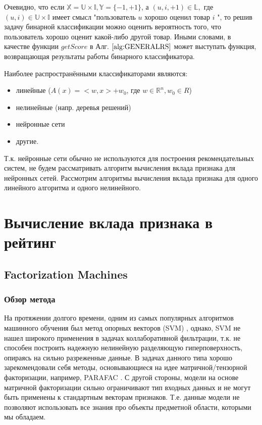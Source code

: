\documentclass[12pt,a4paper]{report}
\begin{document}
Очевидно, что если $\mathbb{X} = \mathbb{U} \times \mathbb{I}, \mathbb{Y} = \{-1, +1\}$, а
 $(u, i, +1) \in \mathbb{L},$ где $(u, i) \in \mathbb{U} \times \mathbb{I}$ имеет смысл "пользователь $u$ хорошо оценил товар $i$ ", то решив задачу бинарной классификации можно оценить вероятность того, что пользователь хорошо оценит какой-либо другой товар. Иными словами, в качестве функции $getScore$ в Алг. $\ref{alg:GENERALRS}$ может выступать функция, возвращающая результаты работы бинарного классификатора.

Наиболее распространёнными классификаторами являются:
\begin{itemize}
\item линейные ($A(x) = <w, x> + w_0$, где $w \in \mathbb{R}^n, w_0 \in R$)
\item нелинейные (напр. деревья решений)
\item нейронные сети
\item другие.
\end{itemize}

Т.к. нейронные сети обычно не используются для построения рекомендательных систем, не будем рассматривать алгоритм вычисления вклада признака для нейронных сетей. Рассмотрим алгоритмы вычисления вклада признака для одного линейного алгоритма и одного нелинейного.
\section{Вычисление вклада признака в рейтинг}
\subsection{Factorization Machines}
\subsubsection{Обзор метода}
На протяжении долгого времени, одним из самых популярных алгоритмов машинного обучения был метод опорных векторов (SVM) \cite{Svm} , однако, SVM не нашел широкого применения в задачах коллаборативной фильтрации, т.к. не способен построить надежную нелинейную разделяющую гиперповерхность, опираясь на сильно разреженные данные. В задачах данного типа хорошо зарекомендовали себя методы, основывающиеся на идее матричной/тензорной факторизации, например, PARAFAC \cite{Parafac}. С другой стороны, модели на основе матричной факторизации сильно ограничивают тип входных данных и не могут быть применены к стандартным векторам признаков. Т.е. данные модели не позволяют использовать все знания про объекты предметной области, которыми мы обладаем.
\end{document}
